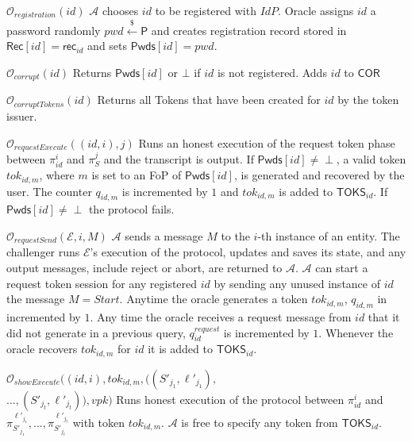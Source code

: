 \documentclass[conference]{IEEEtran}
\newcommand{\cA}{\mathcal{A}}
\newcommand{\cE}{\mathcal{E}}
\newcommand{\cO}{\mathcal{O}}
\newcommand{\pwd}{pwd}
\newcommand{\uid}{id}
\newcommand{\sP}{\mathsf{P}}
\newcommand{\vpk}{vpk}
\begin{document}
\begin{multicols}{2}
\raggedright
\scriptsize
{}\\
\noindent \underline{$\cO_{registration}(\uid)$} %
$\cA$ chooses $\uid$ to be registered with $IdP$. Oracle assigns $\uid$ a password randomly $\pwd \xleftarrow{\$} \sP$ and creates registration record stored in $\mathsf{Rec}[\uid] = \mathsf{rec}_{\uid}$ and sets $\mathsf{Pwds}[\uid] = \pwd$.   
    
\noindent \underline{$\cO_{corrupt}(\uid)$} %
Returns $\mathsf{Pwds}[\uid]$ or $\bot$ if $\uid$ is not registered. Adds $\uid$ to $\mathsf{COR}$     

\noindent \underline{$\cO_{corruptTokens}(\uid)$} %
Returns all Tokens that have been created for $\uid$ by the token issuer.
    
\noindent \underline{$\cO_{requestExecute}((\uid,i),j)$} %
Runs an honest execution of the request token phase between $\pi^{i}_{\uid}$ and $\pi^{j}_{S}$ and the transcript is output. If $\mathsf{Pwds}[\uid] \neq \perp$, a valid token $tok_{\uid,m}$, where $m$ is set to an FoP of $\mathsf{Pwds}[\uid]$, is generated and recovered by the user. The counter $q_{\uid,m}$ is incremented by $1$ and $tok_{\uid,m}$ is added to $\mathsf{TOKS}_{\uid}$. If $\mathsf{Pwds}[\uid] \neq \perp$ the protocol fails.
    
\noindent \underline{$\cO_{requestSend}(\cE,i,M)$} 
$\cA$ sends a message $M$ to the %
$i$-th instance of an entity. The challenger runs $\cE$'s execution of the protocol, updates and saves its state, and any output messages, include reject or abort, are returned to $\cA$. $\cA$ can start a request token session for any registered $\uid$ by sending any unused instance of $\uid$ the message $M = Start$. Anytime the oracle generates a token $tok_{\uid,m}$, $q_{\uid,m}$ in incremented by $1$. Any time the oracle receives a request message from $\uid$ that it did not generate in a previous query, $q^{request}_{\uid}$ is incremented by $1$. Whenever the oracle recovers $tok_{\uid,m}$ for $\uid$ it is added to $\mathsf{TOKS}_{\uid}$.
    
\noindent \underline{$\cO_{showExecute}((\uid,i), tok_{\uid,m}, ((S'_{j_{1}},\ell'_{j_{1}}),$} \\
\underline{$...,(S'_{j_{t}},\ell'_{j_{t}})), \vpk)$} %
Runs honest execution of the protocol between $\pi^{i}_{\uid}$ and $\pi^{\ell'_{j_1}}_{S'_{j_{1}}},...,\pi^{\ell'_{j_t}}_{S'_{j_{t}}}$ with token $tok_{\uid,m}$. $\cA$ is free to specify any token from $\mathsf{TOKS}_{\uid}$.


\end{multicols}
\end{document}
